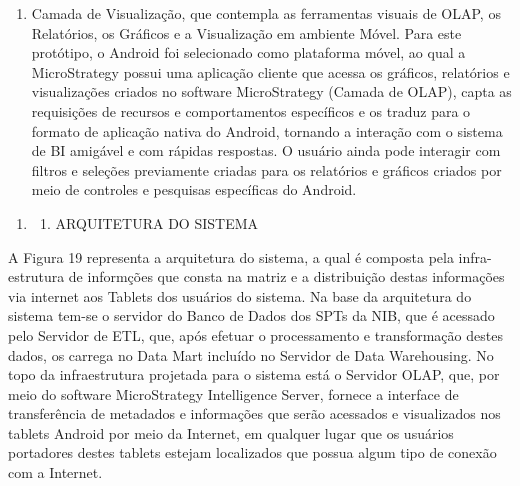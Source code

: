 \documentclass[a4paper]{article}
\newcommand\liststyleWWviiiNumi{%
\renewcommand\theenumi{\arabic{enumi}}
\renewcommand\theenumii{\arabic{enumi}.\arabic{enumii}}
\renewcommand\theenumiii{\arabic{enumi}.\arabic{enumii}.\arabic{enumiii}}
\renewcommand\theenumiv{\arabic{enumi}.\arabic{enumii}.\arabic{enumiii}.\arabic{enumiv}}
\renewcommand\labelenumi{\theenumi}
\renewcommand\labelenumii{\theenumii}
\renewcommand\labelenumiii{\theenumiii}
\renewcommand\labelenumiv{\theenumiv.}
}
\begin{document}
\begin{enumerate}
{{funcionem. As an\'alises OLAP do MicroStrategy s\~ao sens\'iveis \`a boa elabora\c{c}\~ao do modelo, e ao menor
equ\'ivoco no mapeamento ou na elabora\c{c}\~ao do projeto ir\'a exibir dados n\~ao conformes ou n\~ao ir\'a gerar os
relat\'orios das an\'alises. A partir do correto mapeamento, nesta camada que \'e criada a camada de visualiza\c{c}\~ao
do sistema de BI, onde \'e modelado cada relat\'orio, criado e formatado os gr\'aficos, formatada cada
visualiza\c{c}\~ao de determinado ator e elaboradas as poss\'iveis intera\c{c}\~oes do usu\'ario com o sistema. Nesta
camada tamb\'em que se \'e poss\'ivel a formata\c{c}\~ao }\textsf{espec\'ifica para determinada plataforma, e no caso
desta proposta, foi elaborada a visualiza\c{c}\~ao espec\'ifica para o Android como plataforma m\'ovel, onde s\~ao
especificados comportamentos espec\'ificos que determinados recursos e controles visuais devem executar, entre
outros;}}
\item {
\textsf{Camada de Visualiza\c{c}\~ao, que contempla as ferramentas visuais de OLAP, os Relat\'orios, os Gr\'aficos e a
Visualiza\c{c}\~ao em ambiente M\'ovel. Para este prot\'otipo, o Android foi selecionado como plataforma m\'ovel, ao
qual a MicroStrategy possui uma aplica\c{c}\~ao cliente que acessa os gr\'aficos, relat\'orios e visualiza\c{c}\~oes
criados no software MicroStrategy (Camada de OLAP), capta as requisi\c{c}\~oes de recursos e comportamentos
espec\'ificos e os traduz para o formato de aplica\c{c}\~ao nativa do Android, tornando a intera\c{c}\~ao com o sistema
de BI amig\'avel e com r\'apidas respostas. O usu\'ario ainda pode interagir com filtros e sele\c{c}\~oes previamente
criadas para os relat\'orios e gr\'aficos criados por meio de controles e pesquisas espec\'ificas do Android.}}
\end{enumerate}

\bigskip

\liststyleWWviiiNumi
\begin{enumerate}
\item \begin{enumerate}
\item {\sffamily
ARQUITETURA DO SISTEMA }
\end{enumerate}
\end{enumerate}
{
\textsf{A Figura 19 representa a arquitetura do sistema, a qual \'e composta pela infra-estrutura de inform\c{c}\~oes
que consta na matriz e a distribui\c{c}\~ao destas informa\c{c}\~oes via internet aos Tablets dos usu\'arios do
sistema. Na base da arquitetura do sistema tem-se o servidor do Banco de Dados dos SPTs da NIB, que \'e acessado pelo
Servidor de ETL, que, ap\'os efetuar o processamento e transforma\c{c}\~ao destes dados, os carrega no Data Mart
inclu\'ido no Servidor de Data Warehousing. No topo da infraestrutura projetada para o sistema est\'a o Servidor OLAP,
que, por meio do software MicroStrategy Intelligence Server, fornece a interface de transfer\^encia de metadados e
informa\c{c}\~oes que ser\~ao acessados e visualizados nos tablets Android por meio da Internet, em qualquer lugar que
os usu\'arios portadores destes tablets estejam localizados que possua algum tipo de conex\~ao com a Internet. }}
\end{document}
